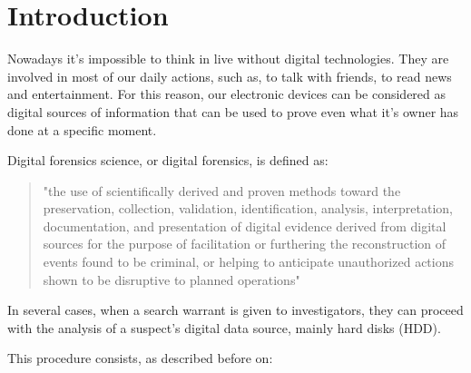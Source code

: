 \cleardoublepage
{}
\chapter*{Introduction}

Nowadays it's impossible to think in live without digital technologies. They
are involved in most of our daily actions, such as, to talk with friends, to
read news and entertainment. For this reason, our electronic devices can be
considered as digital sources of information that can be used to prove even
what it's owner has done at a specific moment.

Digital forensics science, or digital forensics, is defined as:

\begin{quote}
"the use of scientifically derived and proven methods toward the preservation,
collection, validation, identification, analysis, interpretation,
documentation, and presentation of digital evidence derived from digital
sources for the purpose of facilitation or furthering the reconstruction of
events found to be criminal, or helping to anticipate unauthorized actions
shown to be disruptive to planned operations" \cite{DFRWS-df-road-map}
\end{quote}

In several cases, when a search warrant is given to investigators, they can 
proceed with the analysis of a suspect's digital data source, mainly hard disks
(HDD).

This procedure consists, as described before on:

